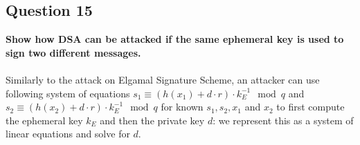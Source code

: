 \documentclass[titlepage]{article}
\begin{document}
{\subsection{Question 15}
{
\textbf{Show how DSA can be attacked if the same ephemeral key is used to sign two different messages.}\\\\
Similarly to the attack on Elgamal Signature Scheme, an attacker can use following system of equations \(s_1 \equiv (h(x_1) + d \cdot r) \cdot k_E^{-1} \mod q\) and \(s_2 \equiv (h(x_2) + d \cdot r) \cdot k_E^{-1} \mod q\) for known \(s_1, s_2, x_1\) and \(x_2\) to first compute the ephemeral key \(k_E\) and then the private key \(d\): we represent this as a system of linear equations and solve for \(d\).
}
}
\end{document}
